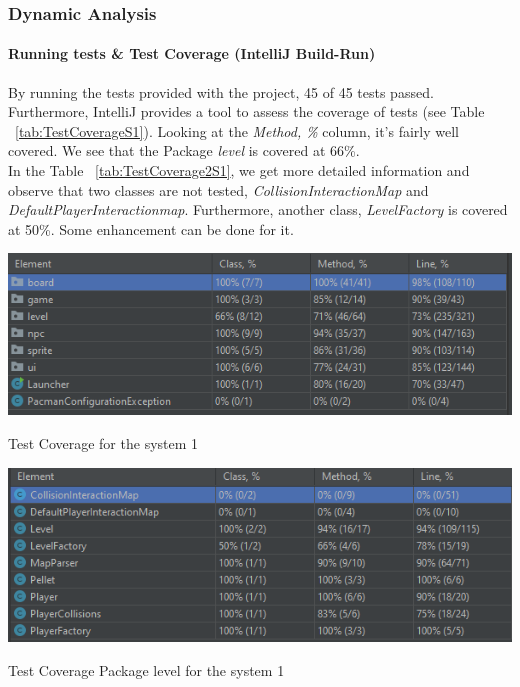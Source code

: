 \documentclass{article}
\begin{document}
\subsubsection{Dynamic Analysis}

\paragraph{Running tests \& Test Coverage (IntelliJ Build-Run)}

By running the tests provided with the project, 45 of 45 tests passed. Furthermore, IntelliJ provides a tool to assess the coverage of tests (see Table ~\ref{tab:TestCoverageS1}). Looking at the \textit{Method, \%} column, it's fairly well covered. We see that the Package \textit{level} is covered at 66\%. \\

In the Table ~\ref{tab:TestCoverage2S1}, we get more detailed information and observe that two classes are not tested, \textit{CollisionInteractionMap} and \textit{DefaultPlayerInteractionmap}. Furthermore, another class, \textit{LevelFactory} is covered at 50\%. Some enhancement can be done for it.

\begin{table}
    \centering
    \includegraphics[width=\linewidth]{imgs/testCoverageS1.PNG}
    \caption{Test Coverage for the system 1}
    \label{tab:TestCoverageS1}
\end{table}

\begin{table}
    \centering
    \includegraphics[width=\linewidth]{imgs/testCoverage2S1.PNG}
    \caption{Test Coverage Package level for the system 1}
    \label{tab:TestCoverage2S1}
\end{table}
\end{document}
